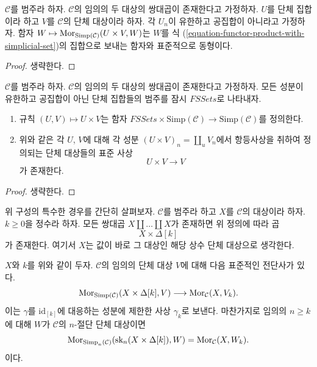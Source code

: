 \begin{lemma}
\label{lemma-check-product-with-simplicial-set}
$\mathcal{C}$를 범주라 하자. $\mathcal{C}$의 임의의 두 대상의
쌍대곱이 존재한다고 가정하자.
$U$를 단체 집합이라 하고 $V$를 $\mathcal{C}$의 단체 대상이라 하자.
각 $U_n$이 유한하고 공집합이 아니라고 가정하자.
함자 $W \mapsto \mathop{\mathrm{Mor}}\nolimits_{\text{Simp}(\mathcal{C})}(U \times V, W)$는
$W$를 식 (\ref{equation-functor-product-with-simplicial-set})의 집합으로
보내는 함자와 표준적으로 동형이다.
\end{lemma}

\begin{proof}
생략한다.
\end{proof}

\begin{lemma}
\label{lemma-back-to-U}
$\mathcal{C}$를 범주라 하자. $\mathcal{C}$의 임의의 두 대상의
쌍대곱이 존재한다고 가정하자.
모든 성분이 유한하고 공집합이 아닌 단체 집합들의 범주를 잠시
$\textit{FSSets}$로 나타내자.
\begin{enumerate}
\item 규칙 $(U, V) \mapsto U \times V$는 함자
$\textit{FSSets} \times \text{Simp}(\mathcal{C})
\to \text{Simp}(\mathcal{C})$를 정의한다.
\item 위와 같은 각 $U$, $V$에 대해 각 성분
$(U \times V)_n = \coprod_u V_n$에서 항등사상을 취하여 정의되는
단체 대상들의 표준 사상
$$
U \times V \longrightarrow V
$$
가 존재한다.
\end{enumerate}
\end{lemma}

\begin{proof}
생략한다.
\end{proof}

\noindent
위 구성의 특수한 경우를 간단히 살펴보자.
$\mathcal{C}$를 범주라 하고 $X$를 $\mathcal{C}$의 대상이라 하자.
$k \geq 0$을 정수라 하자.
모든 쌍대곱 $X \amalg \ldots \amalg X$가 존재하면 위 정의에 따라 곱
$$
X \times \Delta[k]
$$
가 존재한다. 여기서 $X$는 값이 바로 그 대상인 해당 상수 단체 대상으로
생각한다.

\begin{lemma}
\label{lemma-morphism-from-coproduct}
$X$와 $k$를 위와 같이 두자.
$\mathcal{C}$의 임의의 단체 대상 $V$에 대해 다음 표준적인 전단사가 있다.
$$
\mathop{\mathrm{Mor}}\nolimits_{\text{Simp}(\mathcal{C})}(X \times \Delta[k], V)
\longrightarrow
\mathop{\mathrm{Mor}}\nolimits_\mathcal{C}(X, V_k).
$$
이는 $\gamma$를 $\text{id}_{[k]}$에 대응하는 성분에 제한한 사상
$\gamma_k$로 보낸다.
마찬가지로 임의의 $n \geq k$에 대해 $W$가 $\mathcal{C}$의
$n$-절단 단체 대상이면
$$
\mathop{\mathrm{Mor}}\nolimits_{\text{Simp}_n(\mathcal{C})}(\text{sk}_n(X \times \Delta[k]), W)
=
\mathop{\mathrm{Mor}}\nolimits_\mathcal{C}(X, W_k).
$$
이다.
\end{lemma}

